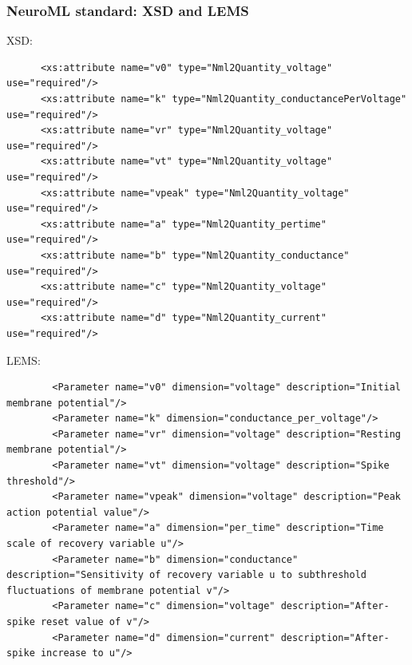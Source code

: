 \begin{frame}[fragile,c]
  \frametitle{NeuroML standard: XSD and LEMS}
  XSD:
  \begin{center}
    \begin{verbatim}
      <xs:attribute name="v0" type="Nml2Quantity_voltage" use="required"/>
      <xs:attribute name="k" type="Nml2Quantity_conductancePerVoltage" use="required"/>
      <xs:attribute name="vr" type="Nml2Quantity_voltage" use="required"/>
      <xs:attribute name="vt" type="Nml2Quantity_voltage" use="required"/>
      <xs:attribute name="vpeak" type="Nml2Quantity_voltage" use="required"/>
      <xs:attribute name="a" type="Nml2Quantity_pertime" use="required"/>
      <xs:attribute name="b" type="Nml2Quantity_conductance" use="required"/>
      <xs:attribute name="c" type="Nml2Quantity_voltage" use="required"/>
      <xs:attribute name="d" type="Nml2Quantity_current" use="required"/>
    \end{verbatim}
  \end{center}
  LEMS:
  \begin{center}
    \begin{verbatim}
        <Parameter name="v0" dimension="voltage" description="Initial membrane potential"/>
        <Parameter name="k" dimension="conductance_per_voltage"/>
        <Parameter name="vr" dimension="voltage" description="Resting membrane potential"/>
        <Parameter name="vt" dimension="voltage" description="Spike threshold"/>
        <Parameter name="vpeak" dimension="voltage" description="Peak action potential value"/>
        <Parameter name="a" dimension="per_time" description="Time scale of recovery variable u"/>
        <Parameter name="b" dimension="conductance" description="Sensitivity of recovery variable u to subthreshold fluctuations of membrane potential v"/>
        <Parameter name="c" dimension="voltage" description="After-spike reset value of v"/>
        <Parameter name="d" dimension="current" description="After-spike increase to u"/>
    \end{verbatim}
  \end{center}
\end{frame}
